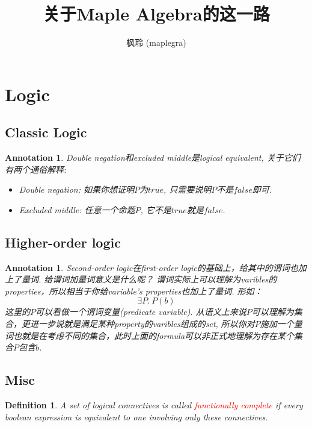\documentclass{article}
\newtheorem{definition}[theorem]{Definition}
\newtheorem{annotation}[theorem]{Annotation}
\newcommand{\redt}[1]{\textcolor{red}{#1}}
\begin{document}
\title{关于Maple Algebra的这一路}
\author{枫聆 (maplegra)}
\maketitle
\tableofcontents
\newpage

\section{Logic}

\subsection{Classic Logic}

\begin{annotation}
\rm Double negation和excluded middle是logical equivalent, 关于它们有两个通俗解释:
\begin{itemize}
	\item Double negation: 如果你想证明$P$为$true$, 只需要说明$P$不是$false$即可.
	\item Excluded middle: 任意一个命题$P$, 它不是$true$就是$false$.
\end{itemize}
\end{annotation}

\subsection{Higher-order logic}

\begin{annotation}
\rm Second-order logic在first-order logic的基础上，给其中的谓词也加上了量词. 给谓词加量词意义是什么呢？ 谓词实际上可以理解为varibles的properties，所以相当于你给variable's properties也加上了量词. 形如：
\[
	\exists P.\ P(b)
\]
这里的$P$可以看做一个谓词变量(predicate variable). 从语义上来说$P$可以理解为集合，更进一步说就是满足某种property的varibles组成的set, 所以你对$P$施加一个量词也就是在考虑不同的集合，此时上面的formula可以非正式地理解为存在某个集合$P$包含$b$.
\end{annotation}

\subsection{Misc}

\begin{definition}
\rm A set of logical connectives is called \redt{functionally complete} if every boolean expression is equivalent to one involving only these connectives.
\end{definition}
\end{document}
